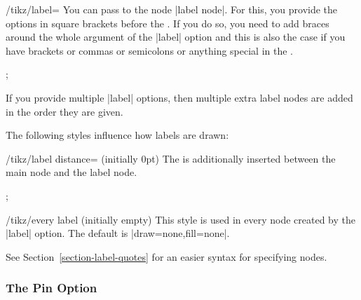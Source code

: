\begin{key}{/tikz/label=}
    You can pass  to the node |label node|. For this, you provide
    the options in square brackets before the . If you do so, you
    need to add braces around the whole argument of the |label| option and this
    is also the case if you have brackets or commas or semicolons or anything
    special in the .
\begin{codeexample}[]
\tikz {};
\end{codeexample}

\begin{codeexample}[]
\end{codeexample}

    If you provide multiple |label| options, then multiple extra label nodes
    are added in the order they are given.

    The following styles influence how labels are drawn:
    \begin{key}{/tikz/label distance= (initially 0pt)}
        The  is additionally inserted between the main node and
        the label node.
\begin{codeexample}[]
\tikz[label distance=5mm]
  ;
\end{codeexample}
    \end{key}
    \begin{stylekey}{/tikz/every label (initially \normalfont empty)}
        This style is used in every node created by the |label| option. The
        default is |draw=none,fill=none|.
    \end{stylekey}
\end{key}

See Section~\ref{section-label-quotes} for an easier syntax for specifying
nodes.


\subsubsection{The Pin Option}

